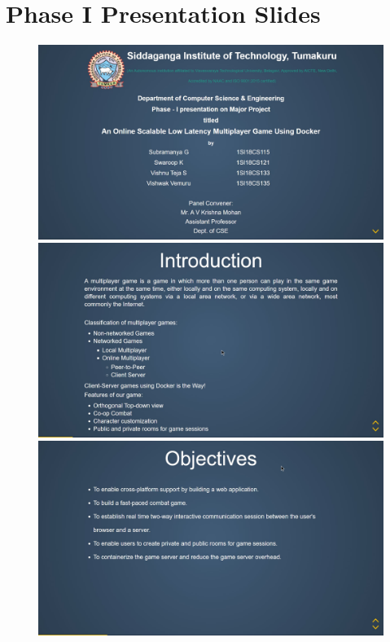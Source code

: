 \documentclass[oneside,12pt]{Classes/VTU}
\begin{document}
	 
	 

\pagebreak

\section*{Phase I Presentation Slides}
	\begin{figure}[ht!]
		\centering
		\includegraphics[scale=0.22]{s1.jpg}\vfill
		\includegraphics[scale=0.22]{s2.jpg}\vfill
		\includegraphics[scale=0.22]{s3.jpg}\vfill
	\end{figure}
\end{document}
